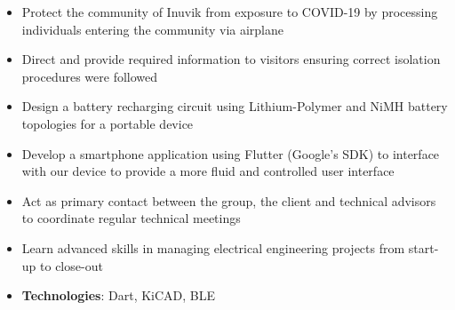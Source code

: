 \documentclass[10pt, letterpaper, ragged2e, withhyper]{altacv}
\begin{document}
\begin{paracol}{2}
            \begin{itemize}
                \item Protect the community of Inuvik from exposure to COVID-19 by processing individuals entering the community via airplane 
                \item Direct and provide required information to visitors ensuring correct isolation procedures were followed
            \end{itemize}

            
    
    \begin{itemize}
        \item Design a battery recharging circuit using Lithium-Polymer and NiMH battery topologies for a portable device 
        \item Develop a smartphone application using Flutter (Google's SDK) to interface with our device to provide a more fluid and 
        controlled user interface
        \item Act as primary contact between the group, the client and technical advisors to coordinate regular technical meetings 
        \item Learn advanced skills in managing electrical engineering projects from start-up to close-out
        \item \textbf{Technologies}: Dart, KiCAD, BLE
    \end{itemize}

\switchcolumn

     \\


\end{paracol}
\end{document}
